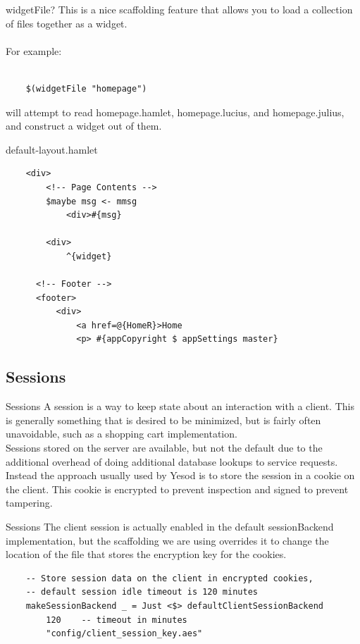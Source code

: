 \documentclass[pdf]{beamer}
\begin{document}
\begin{frame}[fragile]{widgetFile?}
  This is a nice scaffolding feature that allows you to load a
  collection of files together as a widget.\\
  \\
  For example:\\
  \\
  \begin{verbatim}
    $(widgetFile "homepage")
  \end{verbatim}

  will attempt to read homepage.hamlet, homepage.lucius, and
  homepage.julius, and construct a widget out of them.
\end{frame}

\begin{frame}[fragile]{default-layout.hamlet}
  \begin{verbatim}
    <div>
        <!-- Page Contents -->
        $maybe msg <- mmsg
            <div>#{msg}

        <div>
            ^{widget}

      <!-- Footer -->
      <footer>
          <div>
              <a href=@{HomeR}>Home
              <p> #{appCopyright $ appSettings master}
  \end{verbatim}
\end{frame}

\subsection{Sessions}

\begin{frame}{Sessions}
  A session is a way to keep state about an interaction with a
  client. This is generally something that is desired to be minimized,
  but is fairly often unavoidable, such as a shopping cart
  implementation. \\

  Sessions stored on the server are available, but not the default due
  to the additional overhead of doing additional database lookups to
  service requests. \\

  Instead the approach usually used by Yesod is to store the session
  in a cookie on the client. This cookie is encrypted to prevent
  inspection and signed to prevent tampering.
\end{frame}

\begin{frame}[fragile]{Sessions}
  The client session is actually enabled in the default sessionBackend
  implementation, but the scaffolding we are using overrides it to
  change the location of the file that stores the encryption key for
  the cookies. \\

  \begin{verbatim}
    -- Store session data on the client in encrypted cookies,
    -- default session idle timeout is 120 minutes
    makeSessionBackend _ = Just <$> defaultClientSessionBackend
        120    -- timeout in minutes
        "config/client_session_key.aes"
  \end{verbatim}
\end{frame}
\end{document}
